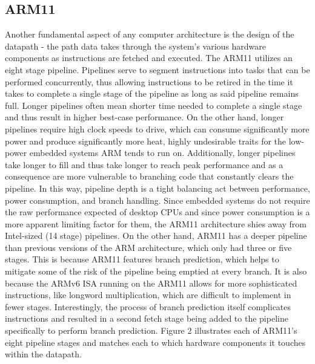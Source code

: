 \documentclass[onecolumn, draftclsnofoot, 10pt, compsoc]{IEEEtran}
\begin{document}
\subsection{ARM11}
Another fundamental aspect of any computer architecture is the design of the datapath - the path data takes through the system's various hardware components as instructions are fetched and executed. The ARM11 utilizes an eight stage pipeline. Pipelines serve to segment instructions into tasks that can be performed concurrently, thus allowing instructions to be retired in the time it takes to complete a single stage of the pipeline as long as said pipeline remains full. Longer pipelines often mean shorter time needed to complete a single stage and thus result in higher best-case performance. On the other hand, longer pipelines require high clock speeds to drive, which can consume significantly more power and produce significantly more heat, highly undesirable traits for the low-power embedded systems ARM tends to run on. Additionally, longer pipelines take longer to fill and thus take longer to reach peak performance and as a consequence are more vulnerable to branching code that constantly clears the pipeline. In this way, pipeline depth is a tight balancing act between performance, power consumption, and branch handling. Since embedded systems do not require the raw performance expected of desktop CPUs and since power consumption is a more apparent limiting factor for them, the ARM11 architecture shies away from Intel-sized (14 stage) pipelines. On the other hand, ARM11 has a deeper pipeline than previous versions of the ARM architecture, which only had three or five stages. This is because ARM11 features branch prediction, which helps to mitigate some of the risk of the pipeline being emptied at every branch. It is also because the ARMv6 ISA running on the ARM11 allows for more sophisticated instructions, like longword multiplication, which are difficult to implement in fewer stages. Interestingly, the process of branch prediction itself complicates instructions and resulted in a second fetch stage being added to the pipeline specifically to perform branch prediction. Figure 2 illustrates each of ARM11's eight pipeline stages and matches each to which hardware components it touches within the datapath.\\ \\
\end{document}
